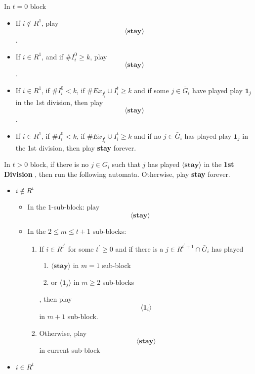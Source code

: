 \documentclass[12pt,letter]{article}
\theoremstyle{definition}
\theoremstyle{remark}
\theoremstyle{claim}
\begin{document}
\begin{itemize}
In $t=0$ block
\begin{itemize}
\item If $i\notin R^1$, play \[\langle \textbf{stay} \rangle \].
\item If $i\in R^1$, and if $\#I^0_i\geq k$, play \[\langle \textbf{stay} \rangle \].
\item If $i\in R^1$, if $\#I^0_i< k$, if $\# Ex_{I^{t}_i}\cup I^{t}_i\geq k$ and if some $j\in \bar{G}_i$ have played play $\mathbf{1}_j$ in the 1st division, then play \[\langle \textbf{stay} \rangle \].
\item If $i\in R^1$, if $\#I^0_i< k$, if $\# Ex_{I^{t}_i}\cup I^{t}_i\geq k$ and if no $j\in \bar{G}_i$ has played play $\mathbf{1}_j$ in the 1st division, then play \textbf{stay} forever.

\end{itemize}


In $t>0$ block, if there is no $j\in G_i$ such that $j$ has played $\langle \textbf{stay} \rangle$ in the \textbf{1st Division} , then run the following automata. Otherwise, play \textbf{stay} forever.

\begin{itemize}
\item $i\notin R^t $
\begin{itemize}
\item In the $1$-sub-block: play
\[\langle \textbf{stay} \rangle \]


\item In the $2\leq m\leq t+1$ sub-blocks: 

\begin{enumerate}

\item If $i\in R^{t^{'}}$ for some $t^{'}\geq 0$ and if there is a $j\in R^{t^{'}+1}\cap \bar{G}_i$ has played 
\begin{enumerate}
\item $\langle \textbf{stay} \rangle $ in $m=1$ sub-block
\item or $\langle \mathbf{1}_j \rangle$ in $m\geq 2$ sub-blocks
\end{enumerate}
, then play 
\[\langle \mathbf{1}_i \rangle\] in $m+1$ sub-block.

\item Otherwise, play
\[\langle \textbf{stay} \rangle\] in current sub-block
\end{enumerate}

\end{itemize}

\item $i\in R^t$


\end{itemize}
\end{itemize}
\end{document}
